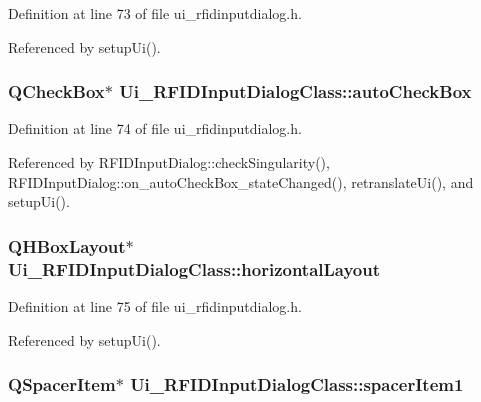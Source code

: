 Definition at line 73 of file ui\_\-rfidinputdialog.h.

Referenced by setupUi().\hypertarget{class_ui___r_f_i_d_input_dialog_class_454ba717043816e016529def2fb17ec2}{
\subsubsection[autoCheckBox]{\setlength{\rightskip}{0pt plus 5cm}QCheckBox$\ast$ {\bf Ui\_\-RFIDInputDialogClass::autoCheckBox}}}
\label{class_ui___r_f_i_d_input_dialog_class_454ba717043816e016529def2fb17ec2}




Definition at line 74 of file ui\_\-rfidinputdialog.h.

Referenced by RFIDInputDialog::checkSingularity(), RFIDInputDialog::on\_\-autoCheckBox\_\-stateChanged(), retranslateUi(), and setupUi().\hypertarget{class_ui___r_f_i_d_input_dialog_class_ad85e4c101e18ac7903e308f57ce2e57}{
\subsubsection[horizontalLayout]{\setlength{\rightskip}{0pt plus 5cm}QHBoxLayout$\ast$ {\bf Ui\_\-RFIDInputDialogClass::horizontalLayout}}}
\label{class_ui___r_f_i_d_input_dialog_class_ad85e4c101e18ac7903e308f57ce2e57}




Definition at line 75 of file ui\_\-rfidinputdialog.h.

Referenced by setupUi().\hypertarget{class_ui___r_f_i_d_input_dialog_class_226268b616a75c1918b6375db6c349d0}{
\subsubsection[spacerItem1]{\setlength{\rightskip}{0pt plus 5cm}QSpacerItem$\ast$ {\bf Ui\_\-RFIDInputDialogClass::spacerItem1}}}
\label{class_ui___r_f_i_d_input_dialog_class_226268b616a75c1918b6375db6c349d0}




